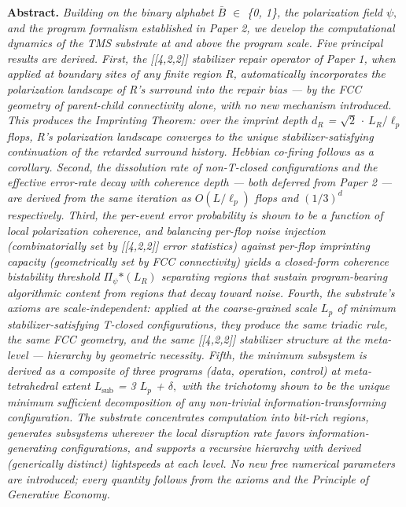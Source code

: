 \documentclass[11pt,oneside]{report}
\theoremstyle{definition}
\theoremstyle{remark}
\newenvironment{paperabstract}
  {\begin{center}\begin{minipage}{0.88\textwidth}\small
   \noindent\textbf{Abstract.}\itshape\space}
  {\end{minipage}\end{center}\vspace{0.4em}}
\begin{document}
\begin{paperabstract}
Building on the binary alphabet \ensuremath{\bar{B}} \ensuremath{\in} \{0, 1\}, the polarization field \ensuremath{\psi ,}
and the program formalism established in Paper 2, we develop the
computational dynamics of the TMS substrate at and above the program
scale. Five principal results are derived. First, the [[4,2,2]]
stabilizer repair operator of Paper 1, when applied at boundary sites of
any finite region R, automatically incorporates the polarization
landscape of R's surround into the repair bias --- by the FCC geometry
of parent-child connectivity alone, with no new mechanism introduced.
This produces the Imprinting Theorem: over the imprint depth \ensuremath{d_{R}} = \ensuremath{\sqrt{2}} \ensuremath{\cdot}
\ensuremath{L_{R}/\ell_{p}} flops, R's polarization landscape converges to the unique
stabilizer-satisfying continuation of the retarded surround history.
Hebbian co-firing follows as a corollary. Second, the dissolution rate
of non-T-closed configurations and the effective error-rate decay with
coherence depth --- both deferred from Paper 2 --- are derived from the
same iteration as \ensuremath{O(L/\ell_{p})} flops and \ensuremath{(1/3)^{d}} respectively. Third, the
per-event error probability is shown to be a function of local
polarization coherence, and balancing per-flop noise injection
(combinatorially set by [[4,2,2]] error statistics) against
per-flop imprinting capacity (geometrically set by FCC connectivity)
yields a closed-form coherence bistability threshold
\textbar \ensuremath{\Pi_{\psi}}\textbar\ensuremath{*(L_{R})} separating regions that sustain
program-bearing algorithmic content from regions that decay toward
noise. Fourth, the substrate's axioms are scale-independent: applied at
the coarse-grained scale \ensuremath{L_{p}} of minimum stabilizer-satisfying T-closed
configurations, they produce the same triadic rule, the same FCC
geometry, and the same [[4,2,2]] stabilizer structure at the
meta-level --- hierarchy by geometric necessity. Fifth, the minimum
subsystem is derived as a composite of three programs (data, operation,
control) at meta-tetrahedral extent \ensuremath{L_{\mathrm{sub}}} = 3 \ensuremath{L_{p}} + \ensuremath{\delta ,} with the
trichotomy shown to be the unique minimum sufficient decomposition of
any non-trivial information-transforming configuration. The substrate
concentrates computation into bit-rich regions, generates subsystems
wherever the local disruption rate favors information-generating
configurations, and supports a recursive hierarchy with derived
(generically distinct) lightspeeds at each level. No new free numerical
parameters are introduced; every quantity follows from the axioms and
the Principle of Generative Economy.
\end{paperabstract}
\end{document}
